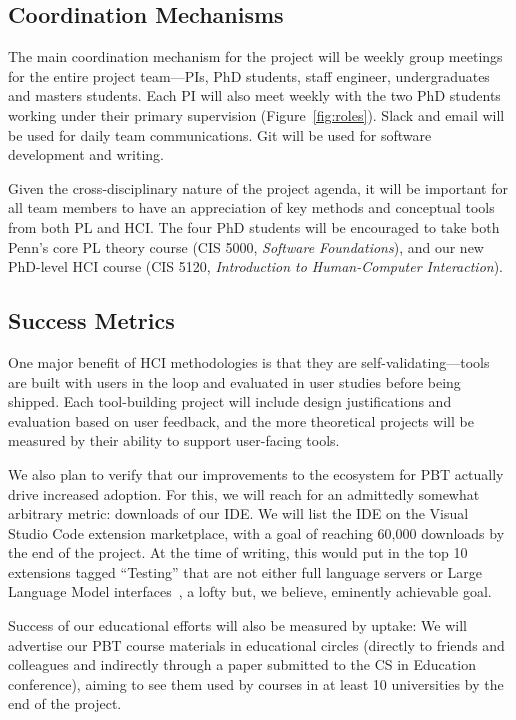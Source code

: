 \subsection*{Coordination Mechanisms}

The main coordination mechanism for the project will be weekly group
meetings for the entire project team---PIs, PhD students, staff
engineer, undergraduates and masters students.
%
Each PI will also meet weekly with the two PhD students working under
their primary supervision (Figure~\ref{fig:roles}).
%
Slack and email will be used for daily team communications.  Git will
be used for software development and writing.

Given the cross-disciplinary nature of the project agenda, it will be
important for all team members to have an appreciation of key methods
and conceptual tools from both PL and HCI.  The four PhD students will
be encouraged to take both Penn's core PL theory course (CIS 5000,
{\em Software Foundations}), and our new PhD-level HCI course (CIS
5120, {\em Introduction to Human-Computer Interaction}).


\subsection*{Success Metrics}

One major benefit of
HCI methodologies is that they are self-validating---tools are built with users
in the loop and evaluated in user studies before being shipped.
Each tool-building project will include design justifications and
evaluation based on user feedback, and the more theoretical
projects will be measured by their ability to support user-facing tools.

We also plan to verify that our improvements to the ecosystem for PBT
actually drive increased adoption. For this, we will reach for an
admittedly somewhat arbitrary metric: downloads of our \tyche{} IDE.
We will list the IDE on the Visual Studio Code extension marketplace,
with a goal of reaching 60,000 downloads by the end of the project. At
the time of writing, this would put \tyche{} in the top 10 extensions
tagged ``Testing'' that are not either full language servers or Large
Language Model interfaces~\cite{noauthor_testing_nodate}, a lofty but,
we believe, eminently achievable goal.

Success of our educational efforts will also be measured by uptake: We
will advertise our PBT course materials in educational circles
(directly to friends and colleagues and indirectly through a paper
submitted to the CS in Education conference), aiming to see them used
by courses in at least 10 universities by the end of the project.


